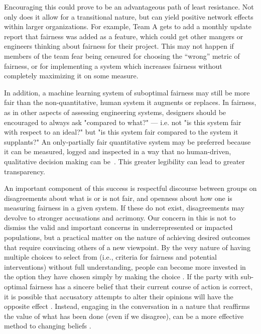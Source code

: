\documentclass[11pt]{article}
\begin{document}
Encouraging this could prove to be an advantageous path of least resistance. Not only does it allow for a transitional nature, but can yield positive network effects within larger organizations. For example, Team A gets to add a monthly update report that fairness was added as a feature, which could get other mangers or engineers thinking about fairness for their project. This may not happen if members of the team fear being censured for choosing the ``wrong'' metric of fairness, or for implementing a system which increases fairness without completely maximizing it on some measure.

In addition, a machine learning system of suboptimal fairness may still be more fair than the non-quantitative, human system it augments or replaces. In fairness, as in other aspects of assessing engineering systems, designers should be encouraged to always ask "compared to what?" --- i.e. not "is this system fair with respect to an ideal?" but "is this system fair compared to the system it supplants?"
An only-partially fair quantitative system may be preferred because it can be measured, logged and inspected in a way that no human-driven, qualitative decision making can be~\cite{henkel2007memory,lind2017choice}. This greater legibility can lead to greater transparency.


An important component of this success is respectful discourse between groups on disagreements about what is or is not fair, and openness about how one is measuring fairness in a given system. If these do not exist, disagreements may devolve to stronger accusations and acrimony.
Our concern in this is not to dismiss the valid and important concerns in underrepresented or impacted populations, but a practical matter on the nature of achieving desired outcomes that require convincing others of a new viewpoint. By the very nature of having multiple choices to select from (i.e., criteria for fairness and potential interventions) without full understanding, people can become more invested in the option they have chosen simply by making the choice \cite{Brehm1956PostdecisionCI}. If the party with sub-optimal fairness has a sincere belief that their current course of action is correct, it is possible that accusatory attempts to alter their opinions will have the opposite effect \cite{Gal2010,Rucker2004}. Instead, engaging in the conversation in a nature that reaffirms the value of what has been done (even if we disagree), can be a more effective method to changing beliefs \cite{Cohen2000}.
\end{document}
